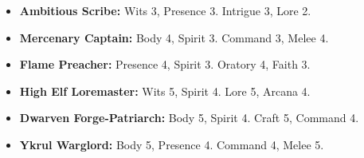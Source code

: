 \begin{tcolorbox}[title=Foils \& Rivals (Tier II--III), colback=white!97!gray,breakable]
\begin{itemize}
  \item \textbf{Ambitious Scribe:} Wits 3, Presence 3. Intrigue 3, Lore 2.
  \item \textbf{Mercenary Captain:} Body 4, Spirit 3. Command 3, Melee 4.
  \item \textbf{Flame Preacher:} Presence 4, Spirit 3. Oratory 4, Faith 3.
\end{itemize}
\end{tcolorbox}

\begin{tcolorbox}[title=Prestige NPCs (Tier IV--V), colback=white!97!gray,breakable]
\begin{itemize}
  \item \textbf{High Elf Loremaster:} Wits 5, Spirit 4. Lore 5, Arcana 4.
  \item \textbf{Dwarven Forge-Patriarch:} Body 5, Spirit 4. Craft 5, Command 4.
  \item \textbf{Ykrul Warglord:} Body 5, Presence 4. Command 4, Melee 5.
\end{itemize}
\end{tcolorbox}

